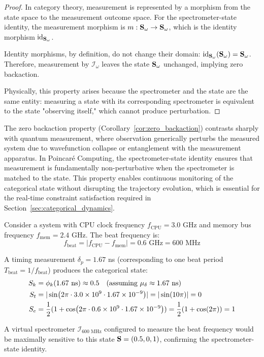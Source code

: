 \begin{proof}
In category theory, measurement is represented by a morphism from the state space to the measurement outcome space. For the spectrometer-state identity, the measurement morphism is $m: \mathbf{S}_\omega \to \mathbf{S}_\omega$, which is the identity morphism $\text{id}_{\mathbf{S}_\omega}$.

Identity morphisms, by definition, do not change their domain: $\text{id}_{\mathbf{S}_\omega}(\mathbf{S}_\omega) = \mathbf{S}_\omega$. Therefore, measurement by $\mathcal{I}_\omega$ leaves the state $\mathbf{S}_\omega$ unchanged, implying zero backaction.

Physically, this property arises because the spectrometer and the state are the same entity: measuring a state with its corresponding spectrometer is equivalent to the state "observing itself," which cannot produce perturbation.
\end{proof}


\begin{remark}
\label{rem:quantum_contrast}
The zero backaction property (Corollary~\ref{cor:zero_backaction}) contrasts sharply with quantum measurement, where observation generically perturbs the measured system due to wavefunction collapse or entanglement with the measurement apparatus. In Poincaré Computing, the spectrometer-state identity ensures that measurement is fundamentally non-perturbative when the spectrometer is matched to the state. This property enables continuous monitoring of the categorical state without disrupting the trajectory evolution, which is essential for the real-time constraint satisfaction required in Section~\ref{sec:categorical_dynamics}.
\end{remark}

\begin{example}
\label{ex:cpu_memory_beat}
Consider a system with CPU clock frequency $f_{\text{CPU}} = 3.0$ GHz and memory bus frequency $f_{\text{mem}} = 2.4$ GHz. The beat frequency is:
\begin{equation}
f_{\text{beat}} = |f_{\text{CPU}} - f_{\text{mem}}| = 0.6 \text{ GHz} = 600 \text{ MHz}
\end{equation}

A timing measurement $\delta_p = 1.67$ ns (corresponding to one beat period $T_{\text{beat}} = 1/f_{\text{beat}}$) produces the categorical state:
\begin{align}
S_k &= \phi_k(1.67 \text{ ns}) \approx 0.5 \quad \text{(assuming } \mu_\delta \approx 1.67 \text{ ns)} \\
S_t &= |\sin(2\pi \cdot 3.0 \times 10^9 \cdot 1.67 \times 10^{-9})| = |\sin(10\pi)| = 0 \\
S_e &= \frac{1}{2}(1 + \cos(2\pi \cdot 0.6 \times 10^9 \cdot 1.67 \times 10^{-9})) = \frac{1}{2}(1 + \cos(2\pi)) = 1
\end{align}

A virtual spectrometer $\mathcal{I}_{600 \text{ MHz}}$ configured to measure the beat frequency would be maximally sensitive to this state $\mathbf{S} = (0.5, 0, 1)$, confirming the spectrometer-state identity.
\end{example}


